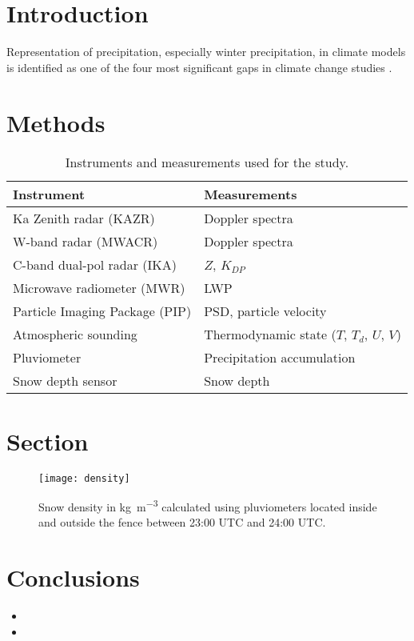 \documentclass[portrait,a1]{a0poster}
\begin{document}
\begin{multicols}{2} %

\section{Introduction}

Representation of precipitation, especially winter precipitation, in climate models is identified as one of the four most significant gaps in climate change studies \citep{schiermeier2010real}.

\lipsum[1]

\section{Methods}

\lipsum[2-3]

\begin{table}[H]
\centering
\begin{tabular}{ll}
\toprule
Instrument						& Measurements \\
\midrule
Ka Zenith radar (KAZR)			& Doppler spectra			\\
W-band radar (MWACR)				& Doppler spectra			\\
C-band dual-pol radar (IKA)		& $Z$, $K_{DP}$				\\
Microwave radiometer (MWR)		& LWP						\\
Particle Imaging Package (PIP)	& PSD, particle velocity		\\
Atmospheric sounding				& Thermodynamic state ($T$, $T_d$, $U$, $V$) \\
Pluviometer						& Precipitation accumulation	\\
Snow depth sensor				& Snow depth 				\\
\bottomrule
\end{tabular}
\caption{Instruments and measurements used for the study.}
\label{tab:instruments}
\end{table}

\section{Section}

\lipsum[4-5]

\begin{figure}[H]
  \centering
    \texttt{[image: density]}
  \caption{Snow density in \si{\kilo\g\per\cubic\metre} calculated using pluviometers located inside and outside the fence between 23:00 UTC and 24:00 UTC.}
  \label{fig:sounding}
\end{figure}

\section{Conclusions}

\begin{itemize}
\item \lipsum[6]
\item \lipsum[7]
\end{itemize}




\end{multicols}

\vfill %
\end{document}
